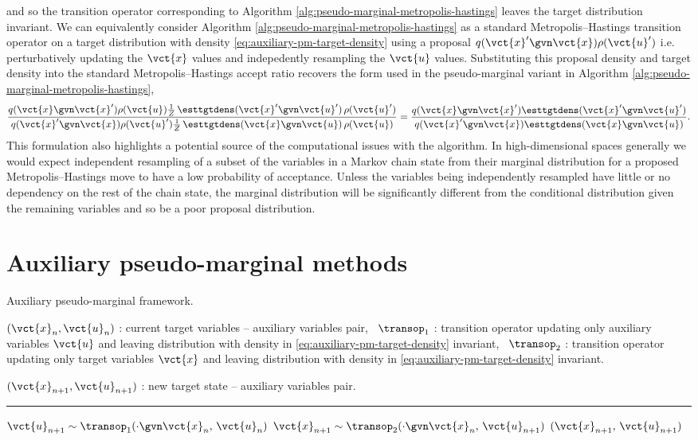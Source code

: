 and so the transition operator corresponding to Algorithm \ref{alg:pseudo-marginal-metropolis-hastings} leaves the target distribution invariant. We can equivalently consider Algorithm \ref{alg:pseudo-marginal-metropolis-hastings} as a standard Metropolis--Hastings transition operator on a target distribution with density  \eqref{eq:auxiliary-pm-target-density} using a proposal $q(\vct{x}'\gvn\vct{x})\rho(\vct{u}')$ i.e. perturbatively updating the $\vct{x}$ values and indepedently resampling the $\vct{u}$ values. Substituting this proposal density and target density into the standard Metropolis--Hastings accept ratio recovers the form used in the pseudo-marginal variant in Algorithm \ref{alg:pseudo-marginal-metropolis-hastings},
\begin{equation}
\frac
  {q(\vct{x}\gvn\vct{x}')\rho(\vct{u})  \frac{1}{Z} \,\esttgtdens(\vct{x}'\gvn\vct{u}')\,\rho(\vct{u}')}
  {q(\vct{x}'\gvn\vct{x})\rho(\vct{u}')  \frac{1}{Z} \,\esttgtdens(\vct{x}\gvn\vct{u})\,\rho(\vct{u})}
  =
\frac
  {q(\vct{x}\gvn\vct{x}')\esttgtdens(\vct{x}'\gvn\vct{u}')}
  {q(\vct{x}'\gvn\vct{x})\esttgtdens(\vct{x}\gvn\vct{u})}.
\end{equation}
This formulation also highlights a potential source of the computational issues with the algorithm. In high-dimensional spaces generally we would expect independent resampling of a subset of the variables in a Markov chain state from their marginal distribution for a proposed Metropolis--Hastings move to have a low probability of acceptance.  Unless the variables being independently resampled have little or no dependency on the rest of the chain state, the marginal distribution will be significantly different from the conditional distribution given the remaining variables and so be a poor proposal distribution.

\section{Auxiliary pseudo-marginal methods}

\begin{algorithm}[!t]
\caption{Auxiliary pseudo-marginal framework.}
\label{alg:auxiliary-pseudo-marginal}
\begin{algorithmic}
\small
    \Require
    $(\vct{x}_n, \vct{u}_n)$ : current target variables -- auxiliary variables pair,~
    $\transop_1$ : transition operator updating only auxiliary variables $\vct{u}$ and leaving distribution with density in \eqref{eq:auxiliary-pm-target-density} invariant,~
    $\transop_2$ : transition operator updating only target variables $\vct{x}$ and leaving distribution with density in \eqref{eq:auxiliary-pm-target-density} invariant.
    \Ensure\raggedright
    $(\vct{x}_{n+1}, \vct{u}_{n+1})$ : new target state  -- auxiliary variables pair.
\end{algorithmic}
\hrule
\small
\begin{algorithmic}[1]
  \State $\vct{u}_{n+1} \sim \transop_1(\cdot \gvn \vct{x}_n,\,\vct{u}_n)$
  \State $\vct{x}_{n+1} \sim \transop_2(\cdot \gvn \vct{x}_n,\,\vct{u}_{n+1})$
  \State \Return $(\vct{x}_{n+1},\, \vct{u}_{n+1})$
\end{algorithmic}
\end{algorithm}

